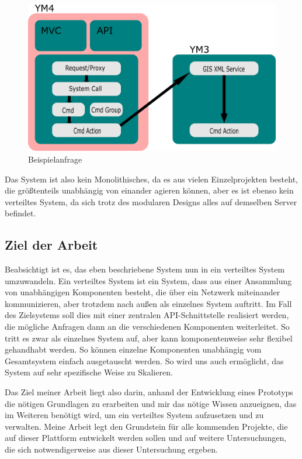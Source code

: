 \documentclass[12pt,a4paper]{scrartcl}
\begin{document}
\begin{figure}[h!]
	\centering
	\includegraphics[scale=2]{YmSysReq.png}
	\caption[Selbst erstellte Grafik]{Beispielanfrage}
\end{figure}

Das System ist also kein Monolithisches, da es aus vielen Einzelprojekten besteht, die größtenteils unabhängig von einander agieren können, aber es ist ebenso kein verteiltes System, da sich trotz des modularen Designs alles auf demselben Server befindet.

\subsection{Ziel der Arbeit}
Beabsichtigt ist es, das eben beschriebene System nun in ein verteiltes System umzuwandeln. Ein verteiltes System ist ein System, dass aus einer Ansammlung von unabhängigen Komponenten besteht, die über ein Netzwerk miteinander kommunizieren, aber trotzdem nach außen als einzelnes System auftritt. Im Fall des Zielsystems soll dies mit einer zentralen API-Schnittstelle realisiert werden, die mögliche Anfragen dann an die verschiedenen Komponenten weiterleitet. So tritt es zwar als einzelnes System auf, aber kann komponentenweise sehr flexibel gehandhabt werden. So können einzelne Komponenten unabhängig vom Gesamtsystem einfach ausgetauscht werden. So wird uns auch ermöglicht, das System auf sehr spezifische Weise zu Skalieren.

Das Ziel meiner Arbeit liegt also darin, anhand der Entwicklung eines Prototyps die nötigen Grundlagen zu erarbeiten und mir das nötige Wissen anzueignen, das im Weiteren benötigt wird, um ein verteiltes System aufzusetzen und zu verwalten. Meine Arbeit legt den Grundstein für alle kommenden Projekte, die auf dieser Plattform entwickelt werden sollen und auf weitere Untersuchungen, die sich notwendigerweise aus dieser Untersuchung ergeben.
\end{document}
